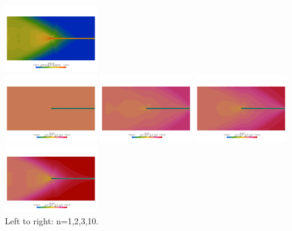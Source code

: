 \begin{center}
\includegraphics[width=4cm]{python_codes/fieldstone_87/results/experiment_07/sr_n10}\\
\includegraphics[width=4cm]{python_codes/fieldstone_87/results/experiment_07/eta_n01}
\includegraphics[width=4cm]{python_codes/fieldstone_87/results/experiment_07/eta_n02}
\includegraphics[width=4cm]{python_codes/fieldstone_87/results/experiment_07/eta_n03}
\includegraphics[width=4cm]{python_codes/fieldstone_87/results/experiment_07/eta_n10}\\
{\captionfont Left to right: n=1,2,3,10.}
\end{center}










